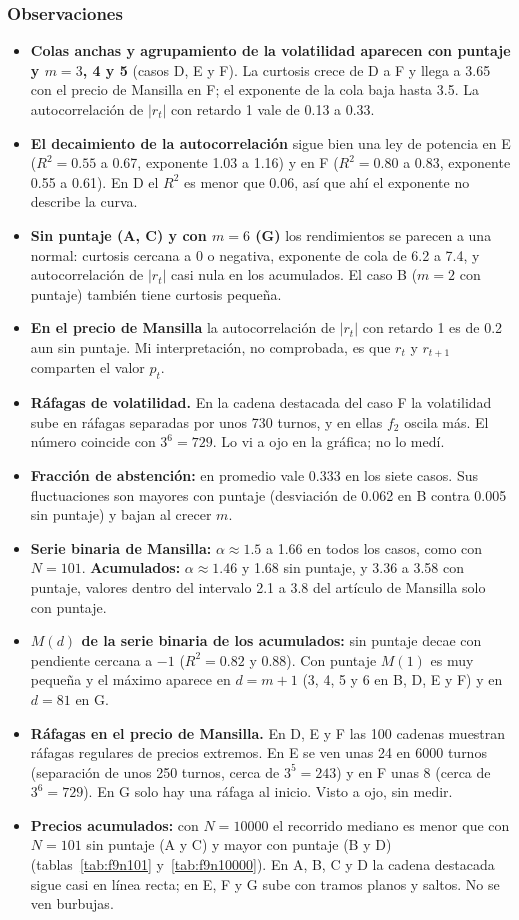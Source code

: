 \documentclass[11pt,letterpaper]{article}
\begin{document}
\subsubsection*{Observaciones}
\begin{itemize}
\item \textbf{Colas anchas y agrupamiento de la volatilidad aparecen con puntaje y $m=3$, 4 y 5} (casos D, E y F). La curtosis crece de D a F y llega a 3.65 con el precio de Mansilla en F; el exponente de la cola baja hasta 3.5. La autocorrelación de $|r_t|$ con retardo 1 vale de 0.13 a 0.33.
\item \textbf{El decaimiento de la autocorrelación} sigue bien una ley de potencia en E ($R^2=0.55$ a 0.67, exponente 1.03 a 1.16) y en F ($R^2=0.80$ a 0.83, exponente 0.55 a 0.61). En D el $R^2$ es menor que 0.06, así que ahí el exponente no describe la curva.
\item \textbf{Sin puntaje (A, C) y con $m=6$ (G)} los rendimientos se parecen a una normal: curtosis cercana a 0 o negativa, exponente de cola de 6.2 a 7.4, y autocorrelación de $|r_t|$ casi nula en los acumulados. El caso B ($m=2$ con puntaje) también tiene curtosis pequeña.
\item \textbf{En el precio de Mansilla} la autocorrelación de $|r_t|$ con retardo 1 es de 0.2 aun sin puntaje. Mi interpretación, no comprobada, es que $r_t$ y $r_{t+1}$ comparten el valor $p_t$.
\item \textbf{Ráfagas de volatilidad.} En la cadena destacada del caso F la volatilidad sube en ráfagas separadas por unos 730 turnos, y en ellas $f_2$ oscila más. El número coincide con $3^6=729$. Lo vi a ojo en la gráfica; no lo medí.
\item \textbf{Fracción de abstención:} en promedio vale 0.333 en los siete casos. Sus fluctuaciones son mayores con puntaje (desviación de 0.062 en B contra 0.005 sin puntaje) y bajan al crecer $m$.
\item \textbf{Serie binaria de Mansilla:} $\alpha\approx 1.5$ a 1.66 en todos los casos, como con $N=101$. \textbf{Acumulados:} $\alpha\approx 1.46$ y 1.68 sin puntaje, y 3.36 a 3.58 con puntaje, valores dentro del intervalo 2.1 a 3.8 del artículo de Mansilla solo con puntaje.
\item \textbf{$M(d)$ de la serie binaria de los acumulados:} sin puntaje decae con pendiente cercana a $-1$ ($R^2=0.82$ y 0.88). Con puntaje $M(1)$ es muy pequeña y el máximo aparece en $d=m+1$ (3, 4, 5 y 6 en B, D, E y F) y en $d=81$ en G.
\item \textbf{Ráfagas en el precio de Mansilla.} En D, E y F las 100 cadenas muestran ráfagas regulares de precios extremos. En E se ven unas 24 en 6000 turnos (separación de unos 250 turnos, cerca de $3^5=243$) y en F unas 8 (cerca de $3^6=729$). En G solo hay una ráfaga al inicio. Visto a ojo, sin medir.
\item \textbf{Precios acumulados:} con $N=10000$ el recorrido mediano es menor que con $N=101$ sin puntaje (A y C) y mayor con puntaje (B y D) (tablas~\ref{tab:f9n101} y~\ref{tab:f9n10000}). En A, B, C y D la cadena destacada sigue casi en línea recta; en E, F y G sube con tramos planos y saltos. No se ven burbujas.
\end{itemize}
\end{document}
